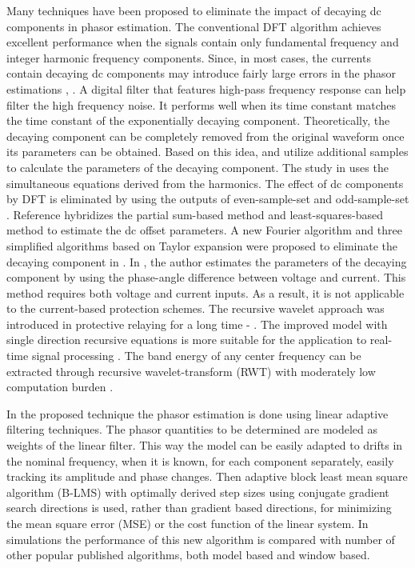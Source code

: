 \documentclass{UCF_ETD}
\begin{document}
Many techniques have been proposed to eliminate the impact of decaying dc components in phasor estimation. The conventional DFT algorithm achieves excellent performance when the signals contain only fundamental frequency and integer harmonic frequency components. Since, in most cases, the currents contain decaying dc components may introduce fairly large errors in the phasor estimations \cite{Phadke1976}, \cite{Stringer1998}. A digital filter that features high-pass frequency response can help filter the high frequency noise. It performs well when its time constant matches the time constant of the exponentially decaying component. Theoretically, the decaying component can be completely removed from the original waveform once its parameters can be obtained. Based on this idea, \cite{Gu2000} and \cite{Yang2000} utilize additional samples to calculate the parameters of the decaying component. The study in \cite{Sidhu2003} uses the simultaneous equations derived from the harmonics. The effect of dc components by DFT is eliminated by using the outputs of even-sample-set and odd-sample-set \cite{Kang2009}. Reference \cite{Nam2009} hybridizes the partial sum-based method and least-squares-based method to estimate the dc offset parameters. A new Fourier algorithm and three simplified algorithms based on Taylor expansion were proposed to eliminate the decaying component in \cite{Gou2003}. In \cite{Yu2006}, the author estimates the parameters of the decaying component by using the phase-angle difference between voltage and current. This method requires both voltage and current inputs. As a result, it is not applicable to the current-based protection schemes. The recursive wavelet approach was introduced in protective relaying for a long time \cite{Chaari1996}- \cite{Lin2005} . The improved model with single direction recursive equations is more suitable for the application to real-time signal processing \cite{Zhang1998}. The band energy of any center frequency can be extracted through recursive wavelet-transform (RWT) with moderately low computation burden \cite{Ren2011}.

In the proposed technique the phasor estimation is done using linear adaptive filtering techniques. The phasor quantities to be determined are modeled as weights of the linear filter. This way the model can be easily adapted to drifts in the nominal frequency, when it is known, for each component separately, easily tracking its amplitude and phase changes. Then adaptive block least mean square algorithm (B-LMS) with optimally derived step sizes using conjugate gradient search directions is used, rather than gradient based directions, for minimizing the mean square error (MSE) or the cost function of the linear system. In simulations the performance of this new algorithm is compared with number of other popular published algorithms, both model based and window based.
\end{document}
